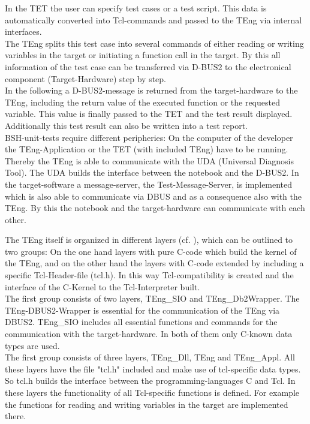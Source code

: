 In the TET the user can specify test cases or a test script. This data is automatically converted into Tcl-commands and passed to the TEng via internal interfaces.
\\
The TEng splits this test case into several commands of either reading or writing variables in the target or initiating a function call in the target. By this all information of the test case can be transferred via D-BUS2 to the electronical component (Target-Hardware) step by step. 
\\
In the following a D-BUS2-message is returned from the target-hardware to the TEng, including the return value of the executed function or the requested variable. This value is finally passed to the TET and the test result displayed. Additionally this test result can also be written into a test report.
\\
BSH-unit-tests require different peripheries:
On the computer of the developer the TEng-Application or the TET (with included TEng) have to be running. Thereby the TEng is able to communicate with the UDA (Universal Diagnosis Tool). The UDA builds the interface between the notebook and the D-BUS2. In the target-software a message-server, the Test-Message-Server, is implemented which is also able to communicate via DBUS and as a consequence also with the TEng.
By this the notebook and the target-hardware can communicate with each other.















The TEng itself is organized in different layers (cf. \cite{testbookone}), which can be outlined to two groups: On the one hand layers with pure C-code which build the kernel of the TEng, and on the other hand the layers with C-code extended by including a specific Tcl-Header-file (tcl.h). In this way Tcl-compatibility is created and the interface of the C-Kernel to the Tcl-Interpreter built.
\\
The first group consists of two layers, TEng\_SIO and TEng\_Db2Wrapper.
The TEng-DBUS2-Wrapper is essential for the communication of the TEng via DBUS2. TEng\_SIO includes all essential functions and commands for the communication with the target-hardware. In both of them only C-known data types are used.
\\
The first group consists of three layers, TEng\_Dll, TEng and TEng\_Appl.
All these layers have the file "tcl.h" included and make use of tcl-specific data types. 
So tcl.h builds the interface between the programming-languages C and Tcl.
In these layers the functionality of all Tcl-specific functions is defined. For example the functions for reading and writing variables in the target are implemented there.








